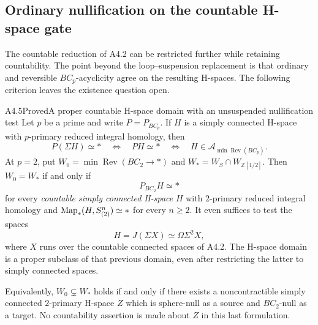 \subsection{Ordinary nullification on the countable H-space gate}
\label{sec:A4-hspace}

The countable reduction of A4.2 can be restricted further while
retaining countability.  The point beyond the loop--suspension
replacement is that ordinary and reversible $BC_p$-acyclicity agree
on the resulting H-spaces.  The following criterion leaves the
existence question open.

\begin{claim}{A4.5}{Proved}{A proper countable H-space domain with an unsuspended nullification test}
\label{A45}
Let $p$ be a prime and write $P=P_{BC_p}$.  If $H$ is a simply
connected H-space with $p$-primary reduced integral homology, then
\[
 P(\Sigma H)\simeq *
 \quad\Longleftrightarrow\quad PH\simeq *
 \quad\Longleftrightarrow\quad
 H\in\mathcal A_{\min\operatorname{Rev}(BC_p)}.
 \tag{A4.5.1}
\]
At $p=2$, put $W_0=\min\operatorname{Rev}(BC_2\to*)$ and
$W_*=W_S\cap W_{\mathbb Z[1/2]}$.  Then $W_0=W_*$ if and only if
\[
 P_{BC_2}H\simeq *
 \tag{A4.5.2}
\]
for every \emph{countable simply connected H-space} $H$ with
$2$-primary reduced integral homology and
$\operatorname{Map}_*(H,S^n_{(2)})\simeq *$ for every $n\geq2$.
It even suffices to test the spaces
\[
 H=J(\Sigma X)\simeq\Omega\Sigma^2X,
 \tag{A4.5.3}
\]
where $X$ runs over the countable connected spaces of A4.2.
The H-space domain is a proper subclass of that previous domain,
even after restricting the latter to simply connected spaces.

Equivalently, $W_0\subsetneq W_*$ holds if and only if there exists
a noncontractible simply connected $2$-primary H-space $Z$ which
is sphere-null as a source and $BC_2$-null as a target.  No
countability assertion is made about $Z$ in this last formulation.
\end{claim}
